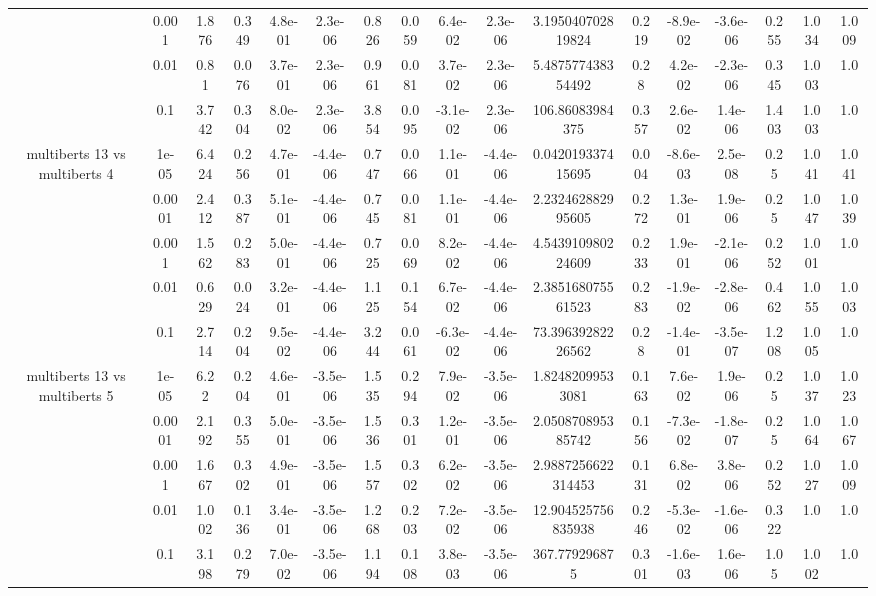 \begin{tabular}{|c|c|c|c|c|c|c|c|c|c|c|c|c|c|c|c|c|}
 & 0.001 & 1.876 & 0.349 & 4.8e-01 & 2.3e-06 & 0.826 & 0.059 & 6.4e-02 & 2.3e-06 & 3.195040702819824 & 0.219 & -8.9e-02 & -3.6e-06 & 0.255 & 1.034 & 1.009 \\
 & 0.01 & 0.81 & 0.076 & 3.7e-01 & 2.3e-06 & 0.961 & 0.081 & 3.7e-02 & 2.3e-06 & 5.487577438354492 & 0.28 & 4.2e-02 & -2.3e-06 & 0.345 & 1.003 & 1.0 \\
 & 0.1 & 3.742 & 0.304 & 8.0e-02 & 2.3e-06 & 3.854 & 0.095 & -3.1e-02 & 2.3e-06 & 106.86083984375 & 0.357 & 2.6e-02 & 1.4e-06 & 1.403 & 1.003 & 1.0 \\
\hline
\multirow{5}{*}{multiberts 13 vs multiberts 4} & 1e-05 & 6.424 & 0.256 & 4.7e-01 & -4.4e-06 & 0.747 & 0.066 & 1.1e-01 & -4.4e-06 & 0.042019337415695 & 0.004 & -8.6e-03 & 2.5e-08 & 0.25 & 1.041 & 1.041 \\
 & 0.0001 & 2.412 & 0.387 & 5.1e-01 & -4.4e-06 & 0.745 & 0.081 & 1.1e-01 & -4.4e-06 & 2.232462882995605 & 0.272 & 1.3e-01 & 1.9e-06 & 0.25 & 1.047 & 1.039 \\
 & 0.001 & 1.562 & 0.283 & 5.0e-01 & -4.4e-06 & 0.725 & 0.069 & 8.2e-02 & -4.4e-06 & 4.543910980224609 & 0.233 & 1.9e-01 & -2.1e-06 & 0.252 & 1.001 & 1.0 \\
 & 0.01 & 0.629 & 0.024 & 3.2e-01 & -4.4e-06 & 1.125 & 0.154 & 6.7e-02 & -4.4e-06 & 2.385168075561523 & 0.283 & -1.9e-02 & -2.8e-06 & 0.462 & 1.055 & 1.003 \\
 & 0.1 & 2.714 & 0.204 & 9.5e-02 & -4.4e-06 & 3.244 & 0.061 & -6.3e-02 & -4.4e-06 & 73.39639282226562 & 0.28 & -1.4e-01 & -3.5e-07 & 1.208 & 1.005 & 1.0 \\
\hline
\multirow{5}{*}{multiberts 13 vs multiberts 5} & 1e-05 & 6.22 & 0.204 & 4.6e-01 & -3.5e-06 & 1.535 & 0.294 & 7.9e-02 & -3.5e-06 & 1.82482099533081 & 0.163 & 7.6e-02 & 1.9e-06 & 0.25 & 1.037 & 1.023 \\
 & 0.0001 & 2.192 & 0.355 & 5.0e-01 & -3.5e-06 & 1.536 & 0.301 & 1.2e-01 & -3.5e-06 & 2.050870895385742 & 0.156 & -7.3e-02 & -1.8e-07 & 0.25 & 1.064 & 1.067 \\
 & 0.001 & 1.667 & 0.302 & 4.9e-01 & -3.5e-06 & 1.557 & 0.302 & 6.2e-02 & -3.5e-06 & 2.9887256622314453 & 0.131 & 6.8e-02 & 3.8e-06 & 0.252 & 1.027 & 1.009 \\
 & 0.01 & 1.002 & 0.136 & 3.4e-01 & -3.5e-06 & 1.268 & 0.203 & 7.2e-02 & -3.5e-06 & 12.904525756835938 & 0.246 & -5.3e-02 & -1.6e-06 & 0.322 & 1.0 & 1.0 \\
 & 0.1 & 3.198 & 0.279 & 7.0e-02 & -3.5e-06 & 1.194 & 0.108 & 3.8e-03 & -3.5e-06 & 367.779296875 & 0.301 & -1.6e-03 & 1.6e-06 & 1.05 & 1.002 & 1.0 \\

\end{tabular}
